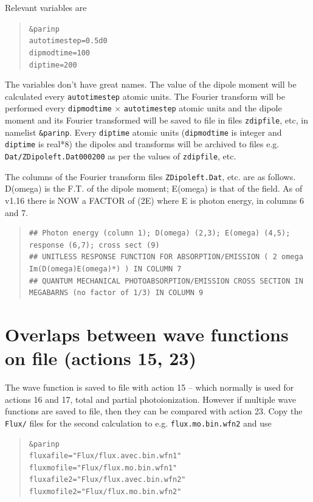 \documentclass[10pt,leqno, oneside]{book}
\begin{document}
Relevant variables are
\begin{quote}
{\footnotesize
\verb#&parinp# \\
\verb#autotimestep=0.5d0# \\
\verb#dipmodtime=100# \\
\verb#diptime=200# \\
}
\end{quote}
The variables don't have great names.  The value of the dipole moment will be calculated every \verb#autotimestep# atomic
units.  The Fourier transform will be performed every \verb#dipmodtime# $\times$ \verb#autotimestep# atomic units and the
dipole moment and its Fourier transformed will be saved to file in files \verb#zdipfile#, etc, in namelist \verb#&parinp#.
Every \verb#diptime# atomic units (\verb#dipmodtime# is integer and \verb#diptime# is real*8) the dipoles and transforms will
be archived to files e.g. \verb#Dat/ZDipoleft.Dat000200# as per the values of \verb#zdipfile#, etc.

The columns of the Fourier transform files \verb#ZDipoleft.Dat#, etc. are as follows.  D(omega) is the F.T. of the dipole moment;
E(omega) is that of the field.  As of v1.16 there is NOW a FACTOR of (2E) where E is photon energy, in columns 6 and 7.

\begin{quote}
{\footnotesize
\begin{verbatim}
## Photon energy (column 1); D(omega) (2,3); E(omega) (4,5); response (6,7); cross sect (9) 
## UNITLESS RESPONSE FUNCTION FOR ABSORPTION/EMISSION ( 2 omega Im(D(omega)E(omega)*) ) IN COLUMN 7 
## QUANTUM MECHANICAL PHOTOABSORPTION/EMISSION CROSS SECTION IN MEGABARNS (no factor of 1/3) IN COLUMN 9 
\end{verbatim}
}
\end{quote}



\section{Overlaps between wave functions on file (actions 15, 23)}

The wave function is saved to file with action 15 -- which normally is used for actions 16 and 17, total and partial photoionization.
However if multiple wave functions are saved to file, then they can be compared with action 23.  Copy the \verb#Flux/# files for the second
calculation to e.g. \verb#flux.mo.bin.wfn2# and use
\begin{quote}
{\footnotesize
\begin{verbatim}
&parinp
fluxafile="Flux/flux.avec.bin.wfn1"
fluxmofile="Flux/flux.mo.bin.wfn1"
fluxafile2="Flux/flux.avec.bin.wfn2"
fluxmofile2="Flux/flux.mo.bin.wfn2"
\end{verbatim}
}
\end{quote}
\end{document}
